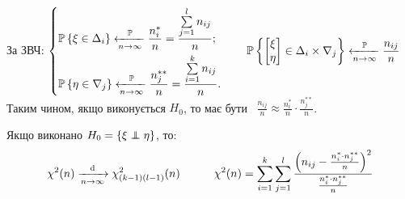 \begin{itemize}
\)\par
За ЗВЧ: \(
\begin{dcases}
\mathbb{P} \left\lbrace  \xi \in \Delta_i \right\rbrace  \xleftarrow[n\to\infty]{\mathbb{P}} \dfrac{n_i^{*}}{n} = \dfrac{\sum\limits_{j=1}^{l}{n_{ij}}}{n}; \\
\mathbb{P} \left\lbrace  \eta \in \nabla_j \right\rbrace  \xleftarrow[n\to\infty]{\mathbb{P}} \dfrac{n_j^{**}}{n} = \dfrac{\sum\limits_{i=1}^{k}{n_{ij}}}{n}.
\end{dcases}
 \qquad
 \mathbb{P} \left\lbrace
 \begin{bmatrix}
  \xi \\ \eta
 \end{bmatrix} \in \Delta_i \times \nabla_j   \right\rbrace  \xleftarrow[n\to\infty]{\mathbb{P}} \dfrac{n_{ij}}{n}
 \)\\
 Таким чином, якщо виконується \( H_0 \), то має бути \ \( \displaystyle \frac{n_{ij}}{n} \approx \frac{n^*_i}{n} \cdot \frac{n^{**}_j}{n} \).
\end{itemize}

\begin{boxteo} Якщо виконано \( H_0 = \left\lbrace \xi \independent \eta \right\rbrace \), то:
\[
 \chi^2(n) \xrightarrow[n\to\infty]{\mathrm{d}} \chi^2_{(k-1)(l-1)}(n) \qquad \quad
 \chi^2(n) =  \sum\limits_{i=1}^{k}{
  \sum\limits_{j=1}^{l}{
  \frac{\left( n_{ij} - \frac{n^*_i \cdot n^{**}_j}{n} \right)^2}{
  \frac{n^*_i \cdot n^{**}_j}{n}
  }
  }
 }
\]
\end{boxteo}
